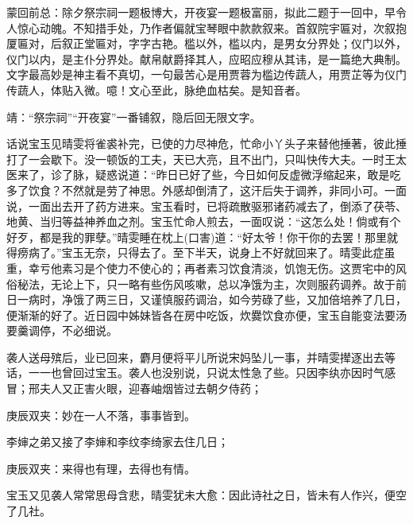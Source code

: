 \begin{parag}
    \begin{note}蒙回前总：除夕祭宗祠一题极博大，开夜宴一题极富丽，拟此二题于一回中，早令人惊心动魄。不知措手处，乃作者偏就宝琴眼中款款叙来。首叙院宇匾对，次叙抱厦匾对，后叙正堂匾对，字字古艳。槛以外，槛以内，是男女分界处；仪门以外，仪门以内，是主仆分界处。献帛献爵择其人，应昭应穆从其讳，是一篇绝大典制。文字最高妙是神主看不真切，一句最苦心是用贾蓉为槛边传蔬人，用贾芷等为仪门传蔬人，体贴入微。噫！文心至此，脉绝血枯矣。是知音者。\end{note}
\end{parag}


\begin{parag}
    \begin{note}靖：“祭宗祠”“开夜宴”一番铺叙，隐后回无限文字。\end{note}
\end{parag}


\begin{parag}
    话说宝玉见晴雯将雀裘补完，已使的力尽神危，忙命小丫头子来替他捶著，彼此捶打了一会歇下。没一顿饭的工夫，天已大亮，且不出门，只叫快传大夫。一时王太医来了，诊了脉，疑惑说道：“昨日已好了些，今日如何反虚微浮缩起来，敢是吃多了饮食？不然就是劳了神思。外感却倒清了，这汗后失于调养，非同小可。一面说，一面出去开了药方进来。宝玉看时，已将疏散驱邪诸药减去了，倒添了茯苓、地黄、当归等益神养血之剂。宝玉忙命人煎去，一面叹说：“这怎么处！倘或有个好歹，都是我的罪孽。”晴雯睡在枕上(口害)道：“好太爷！你干你的去罢！那里就得痨病了。”宝玉无奈，只得去了。至下半天，说身上不好就回来了。晴雯此症虽重，幸亏他素习是个使力不使心的；再者素习饮食清淡，饥饱无伤。这贾宅中的风俗秘法，无论上下，只一略有些伤风咳嗽，总以净饿为主，次则服药调养。故于前日一病时，净饿了两三日，又谨慎服药调治，如今劳碌了些，又加倍培养了几日，便渐渐的好了。近日园中姊妹皆各在房中吃饭，炊爨饮食亦便，宝玉自能变法要汤要羹调停，不必细说。
\end{parag}


\begin{parag}
    袭人送母殡后，业已回来，麝月便将平儿所说宋妈坠儿一事，并晴雯撵逐出去等话，一一也曾回过宝玉。袭人也没别说，只说太性急了些。只因李纨亦因时气感冒；邢夫人又正害火眼，迎春岫烟皆过去朝夕侍药；\begin{note}庚辰双夹：妙在一人不落，事事皆到。\end{note}李婶之弟又接了李婶和李纹李绮家去住几日；\begin{note}庚辰双夹：来得也有理，去得也有情。\end{note}宝玉又见袭人常常思母含悲，晴雯犹未大愈：因此诗社之日，皆未有人作兴，便空了几社。
\end{parag}


